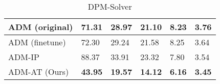 \begin{table}[!t]
\begin{subtable}[h]{0.48\textwidth}
{\begin{tabular}{l l l l l l}
         ADM (original) & 71.31 & 28.97 & 21.10 & 8.23 & 3.76\\
         \midrule
         ADM (finetune) & 72.30 & 29.24 & 21.58 & 8.25 & 3.64 \\
         ADM-IP & 88.37 & 33.91 & 23.32 & 7.80 & 3.54\\
         ADM-AT (Ours) & \bf43.95 & \bf19.57 & \bf14.12 & \bf6.16 & \bf3.45\\
        \bottomrule
        \end{tabular}
        }
     \end{subtable}
    \hfill
    \begin{subtable}[h]{0.48\textwidth}
        \centering
        \caption{DPM-Solver}
     \end{subtable}
    \label{tab:I64}
\end{table}